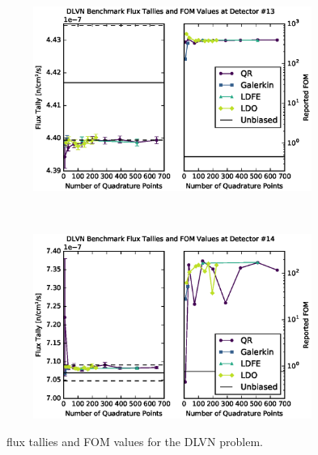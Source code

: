 \begin{figure}[!htb]
\ContinuedFloat
\begin{subfigure}{\linewidth}
\centering
\includegraphics[max height=0.445\textheight]
{img/dlvn-plots/mcnp/fwc-13.eps}
\label{dlvn-fwc-13}
\end{subfigure} 
\\
\begin{subfigure}{\linewidth}
\centering
\includegraphics[max height=0.445\textheight]
{img/dlvn-plots/mcnp/fwc-14.eps}
\label{dlvn-fwc-14}
\end{subfigure}
\caption{\fwc\ flux tallies and FOM values for the DLVN problem.}
\label{dlvn-fwc-tally}
\end{figure}

